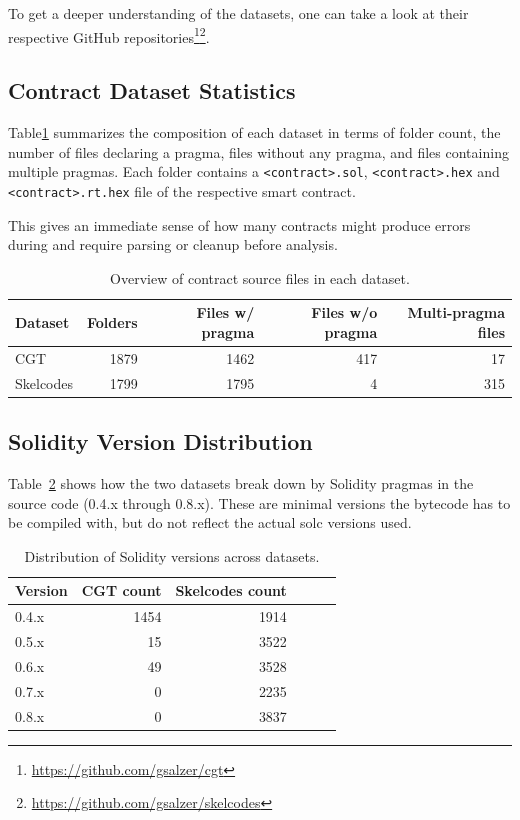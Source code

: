 \documentclass{article}
\begin{document}
	To get a deeper understanding of the datasets, one can take a look at their respective GitHub repositories\footnote{\url{https://github.com/gsalzer/cgt}}\footnote{\url{https://github.com/gsalzer/skelcodes}}.
	\subsection{Contract Dataset Statistics}
	Table\ref{tab:source-overview} summarizes the composition of each dataset in terms of folder count, the number of files declaring a pragma, files without any pragma, and files containing multiple pragmas. Each folder contains a \texttt{<contract>.sol}, \texttt{<contract>.hex} and \texttt{<contract>.rt.hex} file of the respective smart contract.

	This gives an immediate sense of how many contracts might produce errors during and require parsing or cleanup before analysis.

	\begin{table}[ht]
		\centering
		\begin{tabular}{lrrrr}
			\toprule
			\textbf{Dataset} & \textbf{Folders} & \textbf{Files w/ pragma} & \textbf{Files w/o pragma} & \textbf{Multi-pragma files} \\
			\midrule
			CGT        & 1879 & 1462 & 417 & 17\\
			Skelcodes  & 1799 & 1795 & 4   & 315\\
			\bottomrule
		\end{tabular}
		\caption{Overview of contract source files in each dataset.}
		\label{tab:source-overview}
	\end{table}

	\subsection{Solidity Version Distribution}
	Table~\ref{tab:solidity-distribution} shows how the two datasets break down by Solidity pragmas in the source code (0.4.x through 0.8.x). These are minimal versions the bytecode has to be compiled with, but do not reflect the actual solc versions used.

	\begin{table}[ht]
		\centering
		\begin{tabular}{lrrrrr}
			\toprule
			\textbf{Version} & \textbf{CGT count} & \textbf{Skelcodes count} \\
			\midrule
			0.4.x & 1454 & 1914 \\
			0.5.x & 15   & 3522 \\
			0.6.x & 49   & 3528 \\
			0.7.x & 0    & 2235 \\
			0.8.x & 0    & 3837 \\
			\bottomrule
		\end{tabular}
		\caption{Distribution of Solidity versions across datasets.}
		\label{tab:solidity-distribution}
	\end{table}
\end{document}
